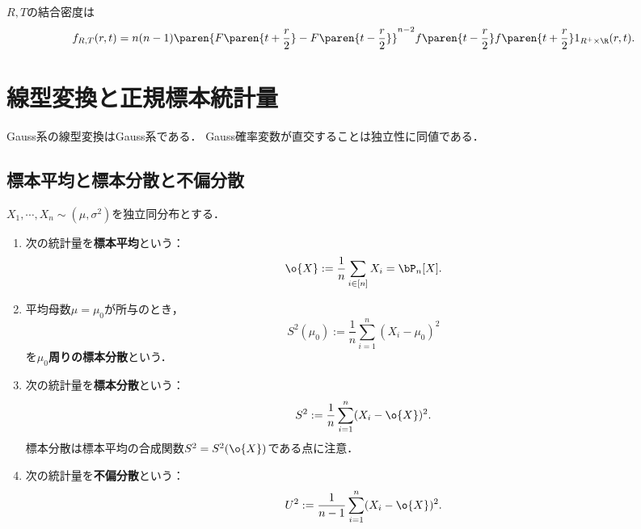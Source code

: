 \documentclass[uplatex,dvipdfmx]{jsreport}
\begin{document}
\begin{proposition}
    $R,T$の結合密度は
    \[f_{R,T}(r,t)=n(n-1)\paren{F\paren{t+\frac{r}{2}}-F\paren{t-\frac{r}{2}}}^{n-2}f\paren{t-\frac{r}{2}}f\paren{t+\frac{r}{2}}1_{R^+\times\R}(r,t).\]
\end{proposition}

\section{線型変換と正規標本統計量}

\begin{tcolorbox}[colframe=ForestGreen, colback=ForestGreen!10!white,breakable,colbacktitle=ForestGreen!40!white,coltitle=black,fonttitle=\bfseries\sffamily,
title=]
    Gauss系の線型変換はGauss系である．
    Gauss確率変数が直交することは独立性に同値である．
\end{tcolorbox}

\subsection{標本平均と標本分散と不偏分散}

\begin{definition}
    $X_1,\cdots,X_n\sim(\mu,\sigma^2)$を独立同分布とする．
    \begin{enumerate}
        \item 次の統計量を\textbf{標本平均}という：
        \[\o{X}:=\frac{1}{n}\sum_{i\in[n]}X_i=\bP_n[X].\]
        \item 平均母数$\mu=\mu_0$が所与のとき，
        \[S^2(\mu_0):=\frac{1}{n}\sum_{i=1}^n(X_i-\mu_0)^2\]
        を\textbf{$\mu_0$周りの標本分散}という．
        \item 次の統計量を\textbf{標本分散}という：
        \[S^2:=\frac{1}{n}\sum_{i=1}^n(X_i-\o{X})^2.\]
        標本分散は標本平均の合成関数$S^2=S^2(\o{X})$である点に注意．
        \item 次の統計量を\textbf{不偏分散}という：
        \[U^2:=\frac{1}{n-1}\sum_{i=1}^n(X_i-\o{X})^2.\]
    \end{enumerate}
\end{definition}
\end{document}
